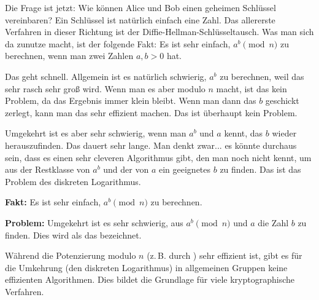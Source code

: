 \begin{spoken-clean}[00:20:04 - 00:22:30]
Die Frage ist jetzt: Wie können Alice und Bob einen geheimen Schlüssel vereinbaren? Ein Schlüssel ist natürlich einfach eine Zahl. Das allererste Verfahren in dieser Richtung ist der Diffie-Hellman-Schlüsseltausch. Was man sich da zunutze macht, ist der folgende Fakt: Es ist sehr einfach, $a^b \pmod n$ zu berechnen, wenn man zwei Zahlen $a, b > 0$ hat.

Das geht schnell. Allgemein ist es natürlich schwierig, $a^b$ zu berechnen, weil das sehr rasch sehr groß wird. Wenn man es aber modulo $n$ macht, ist das kein Problem, da das Ergebnis immer klein bleibt. Wenn man dann das $b$ geschickt zerlegt, kann man das sehr effizient machen. Das ist überhaupt kein Problem.

Umgekehrt ist es aber sehr schwierig, wenn man $a^b$ und $a$ kennt, das $b$ wieder herauszufinden. Das dauert sehr lange. Man denkt zwar... es könnte durchaus sein, dass es einen sehr cleveren Algorithmus gibt, den man noch nicht kennt, um aus der Restklasse von $a^b$ und der von $a$ ein geeignetes $b$ zu finden. Das ist das Problem des diskreten Logarithmus.
\end{spoken-clean}

\begin{math-stroke}
\textbf{Fakt:} Es ist sehr einfach, $a^b \pmod n$ zu berechnen.

\textbf{Problem:} Umgekehrt ist es sehr schwierig, aus $a^b \pmod n$ und $a$ die Zahl $b$ zu finden. Dies wird als das  bezeichnet.

\begin{explanation-of-steps}
Während die Potenzierung modulo $n$ (z.\,B. durch ) sehr effizient ist, gibt es für die Umkehrung (den diskreten Logarithmus) in allgemeinen Gruppen keine effizienten Algorithmen. Dies bildet die Grundlage für viele kryptographische Verfahren.
\end{explanation-of-steps}
\end{math-stroke}

